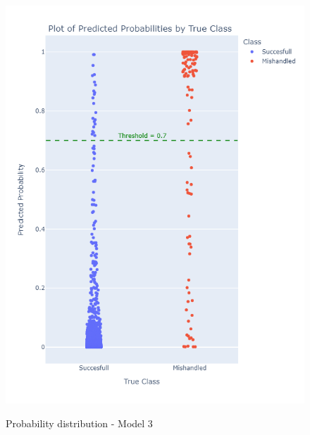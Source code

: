 \documentclass[12pt]{article}
\begin{document}
\begin{figure}
\begin{minipage}[c]{0.4\linewidth}
    \includegraphics[width=1\textwidth]{Probability_distribution_Model 3.png}\\
    \caption{Probability distribution - Model 3}
\end{minipage}
\end{figure}
\end{document}
